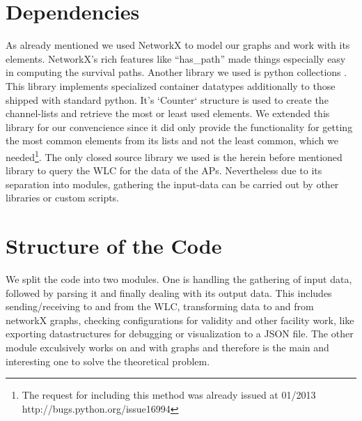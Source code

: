   \section{Dependencies}
    As already mentioned we used NetworkX\cite{hagberg-2008-exploring} to model our graphs and work with its elements.
    NetworkX's rich features like ``has\_path'' made things especially easy in computing the survival paths.
    Another library we used is python collections \cite{python_collections}.
    This library implements specialized container datatypes additionally to those shipped with standard python.
    It's `Counter` structure is used to create the channel-lists and retrieve the most or least used elements.
    We extended this library for our convencience since it did only provide the functionality for getting the most common elements from its lists and not the least common,
    which we needed\footnote{The request for including this method was already issued at 01/2013 http://bugs.python.org/issue16994}.
    The only closed source library we used is the herein before mentioned library to query the WLC for the data of the APs. 
    Nevertheless due to its separation into modules, gathering the input-data can be carried out by other libraries or custom scripts.
  
  \section{Structure of the Code}
    We split the code into two modules. One is handling the gathering of input data, followed by parsing it and finally dealing with its output data.
    This includes sending/receiving to and from the \ac{WLC}, transforming data to and from networkX graphs, checking configurations for validity and other facility work,
    like exporting datastructures for debugging or visualization to a \ac{JSON} file.
    The other module exculsively works on and with graphs and therefore is the main and interesting one to solve the theoretical problem.
    
